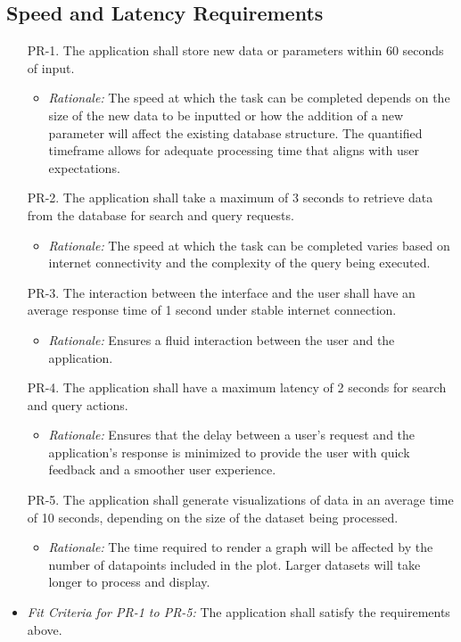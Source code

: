 \documentclass[12pt]{article}
\begin{document}
\subsection{Speed and Latency Requirements}
\begin{enumerate}
\item[PR-1.] The application shall store new data or parameters within 60 seconds of input.
  \begin{itemize}
    \item \textit{Rationale:} The speed at which the task can be completed depends on the size of the new data to be inputted or how the addition of a new parameter will affect the existing database structure. The quantified timeframe allows for adequate processing time that aligns with user expectations.
  \end{itemize}
\item[PR-2.] The application shall take a maximum of 3 seconds to retrieve data from the database for search and query requests.
  \begin{itemize}
    \item \textit{Rationale:} The speed at which the task can be completed varies based on internet connectivity and the complexity of the query being executed.
  \end{itemize}
\item[PR-3.] The interaction between the interface and the user shall have an average response time of 1 second under stable internet connection.
  \begin{itemize}
    \item \textit{Rationale:} Ensures a fluid interaction between the user and the application.
  \end{itemize}
\item[PR-4.] The application shall have a maximum latency of 2 seconds for search and query actions.
  \begin{itemize}
    \item \textit{Rationale:} Ensures that the delay between a user's request and the application's response is minimized to provide the user with quick feedback and a smoother user experience.
  \end{itemize}
\item[PR-5.] The application shall generate visualizations of data in an average time of 10 seconds, depending on the size of the dataset being processed.
  \begin{itemize}
    \item \textit{Rationale:} The time required to render a graph will be affected by the number of datapoints included in the plot. Larger datasets will take longer to process and display.
  \end{itemize}
\end{enumerate}
\begin{itemize}
  \item \textit{Fit Criteria for PR-1 to PR-5:} The application shall satisfy the requirements above.
\end{itemize}
\end{document}
